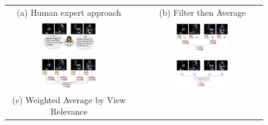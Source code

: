 \begin{figure}[!t]
\begin{tabular}{c c c}
\begin{minipage}{.45\textwidth}
(a) Human expert approach
\end{minipage}
& &
\begin{minipage}{.45\textwidth}
(b) Filter then Average {\scriptsize \citep{holste2022automated}}
\end{minipage}
\\
\includegraphics[width=0.45\textwidth]{figures/MIL_for_AS_diagram_1.pdf}
& &
\includegraphics[width=0.45\textwidth]{figures/MIL_for_AS_diagram_2.pdf}
\\
\includegraphics[width=0.45\textwidth]{figures/MIL_for_AS_diagram_3.pdf}
& &
\includegraphics[width=0.45\textwidth]{figures/MIL_for_AS_diagram_4.pdf}
\\
\begin{minipage}{.45\textwidth}
(c) Weighted Average by View Relevance {\scriptsize \citep{wessler2023automated,huang2021new}}
\end{minipage}
& &
\begin{minipage}{.45\textwidth}

\end{minipage}
\end{tabular}
\end{figure}
